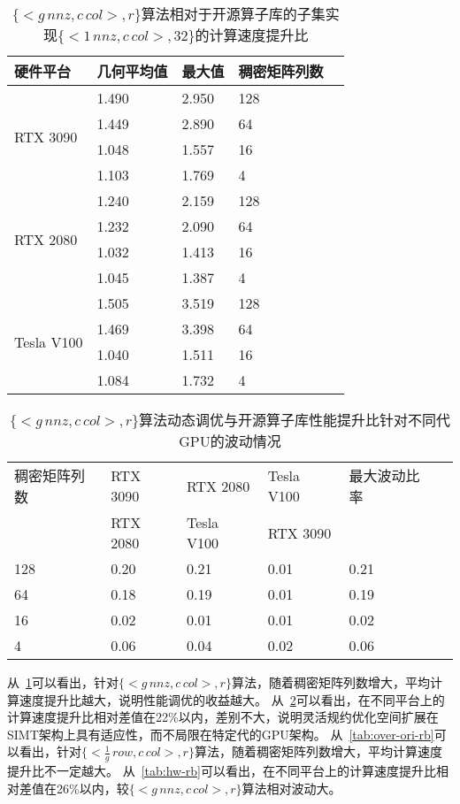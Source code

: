 \begin{table}
  \centering
  \caption{$\{<g\,nnz , c\,col>,r\}$算法相对于开源算子库的子集实现$\{<1\,nnz , c\,col>,32\}$的计算速度提升比}
  \begin{tabular}{lllll}
  \toprule
  硬件平台 & 几何平均值  & 最大值 & 稠密矩阵列数 \\
  \midrule
  \multirow{4}{*}{RTX 3090}& 1.490  & 2.950  & 128\\
                          & 1.449   & 2.890  & 64\\
                          & 1.048   & 1.557  & 16\\
                          & 1.103   & 1.769 & 4\\
  \hline
  \multirow{4}{*}{RTX 2080}& 1.240   & 2.159  & 128\\
                          & 1.232   & 2.090  & 64\\
                          & 1.032   & 1.413  & 16\\
                          & 1.045   & 1.387  & 4\\
  \hline
  \multirow{4}{*}{Tesla V100}   & 1.505   & 3.519  & 128\\
                          & 1.469   & 3.398  & 64\\
                          & 1.040   & 1.511  & 16\\
                          & 1.084   & 1.732  & 4\\
  \bottomrule
  \end{tabular}
  \label{tab:over-ori-eb}%
\end{table}
\begin{table}
  \centering
  \caption{$\{<g\,nnz , c\,col>,r\}$算法动态调优与开源算子库性能提升比针对不同代GPU的波动情况}
  \begin{tabular}{llllll}
  \toprule
  稠密矩阵列数 & RTX 3090 & RTX 2080   & Tesla V100 & 最大波动比率 \\
    & RTX 2080 & Tesla V100 & RTX 3090   &  \\
  \midrule
  128 & 0.20 & 0.21 & 0.01 & 0.21 \\
  64  & 0.18 & 0.19 & 0.01 & 0.19 \\
  16  & 0.02 & 0.01 & 0.01 & 0.02 \\
  4   & 0.06 & 0.04 & 0.02 & 0.06 \\
  \bottomrule
  \end{tabular}
  \label{tab:hw-eb}
\end{table}
从~\ref{tab:over-ori-eb}可以看出，针对$\{<g\,nnz , c\,col>,r\}$算法，随着稠密矩阵列数增大，平均计算速度提升比越大，说明性能调优的收益越大。
从~\ref{tab:hw-eb}可以看出，在不同平台上的计算速度提升比相对差值在22\%以内，差别不大，说明灵活规约优化空间扩展在SIMT架构上具有适应性，而不局限在特定代的GPU架构。
从~\ref{tab:over-ori-rb}可以看出，针对$\{<\frac{1}{g}\,row , c\,col>,r\}$算法，随着稠密矩阵列数增大，平均计算速度提升比不一定越大。
从~\ref{tab:hw-rb}可以看出，在不同平台上的计算速度提升比相对差值在26\%以内，较$\{<g\,nnz , c\,col>,r\}$算法相对波动大。
